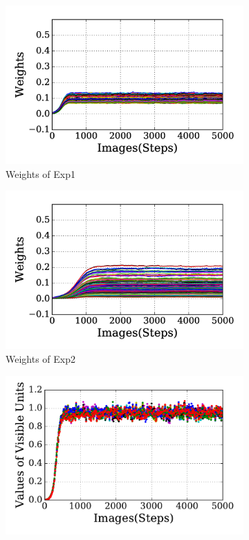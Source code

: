 \begin{figure}
	\centering
	\begin{subfigure}[t]{0.48\textwidth}
		\includegraphics[width=\textwidth]{pics_sdlm/21_exp_AE_noise/exp1_weights_s.png}
		\caption{Weights of Exp1}
	\end{subfigure}
	\begin{subfigure}[t]{0.48\textwidth}
		\includegraphics[width=\textwidth]{pics_sdlm/21_exp_AE_noise/exp2_weights_s.png}
		\caption{Weights of Exp2}
	\end{subfigure}
	\begin{subfigure}[t]{0.48\textwidth}
		\includegraphics[width=\textwidth]{pics_sdlm/21_exp_AE_noise/exp1_recon_s.pdf}

\end{subfigure}
\end{figure}
